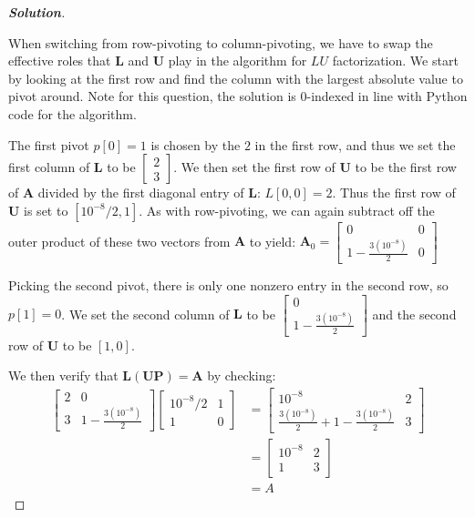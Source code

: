 \documentclass[11pt]{article}
\renewcommand{\vec}[1]{\mathbf{#1}}
\newenvironment{solution}{%
  \begin{proof}[\textbf{Solution}]$ $\par\nobreak\ignorespaces
}{%
  \end{proof}
}
\theoremstyle{definition}
\begin{document}
\begin{solution}
When switching from row-pivoting to column-pivoting, we have to swap the effective roles that $\vec{L}$ and $\vec{U}$ play in the algorithm for $LU$ factorization. We start by looking at the first row and find the column with the largest absolute value to pivot around. Note for this question, the solution is 0-indexed in line with Python code for the algorithm.

The first pivot $p[0] = 1$ is chosen by the $2$ in the first row, and thus we set the first column of $\vec{L}$ to be $\begin{bmatrix*}2 \\ 3\end{bmatrix*}$. We then set the first row of $\vec{U}$ to be the first row of $\vec{A}$ divided by the first diagonal entry of $\vec{L}$: $L[0, 0] = 2$. Thus the first row of $\vec{U}$ is set to $[10^{-8}/2, 1]$. As with row-pivoting, we can again subtract off the outer product of these two vectors from $\vec{A}$ to yield: $\vec{A}_0 = \begin{bmatrix*}0 & 0 \\1 - \frac{3(10^{-8})}{2} & 0\end{bmatrix*}$

Picking the second pivot, there is only one nonzero entry in the second row, so $p[1] = 0$. We set the second column of $\vec{L}$ to be $\begin{bmatrix*}0 \\ 1 - \frac{3(10^{-8})}{2}\end{bmatrix*}$ and the second row of $\vec{U}$ to be $[1, 0]$.

We then verify that $\vec{L}(\vec{UP}) = \vec{A}$ by checking:
\begin{align*}
    \begin{bmatrix*}2 & 0 \\3 & 1 - \frac{3(10^{-8})}{2}\end{bmatrix*}\begin{bmatrix*}10^{-8}/2 & 1 \\ 1 & 0\end{bmatrix*} &= \begin{bmatrix*}10^{-8} & 2 \\ \frac{3(10^{-8})}{2} + 1 - \frac{3(10^{-8})}{2} & 3\end{bmatrix*} \\
    &= \begin{bmatrix*}10^{-8} & 2 \\ 1 & 3\end{bmatrix*} \\
    &= A
\end{align*}


\end{solution}
\end{document}
